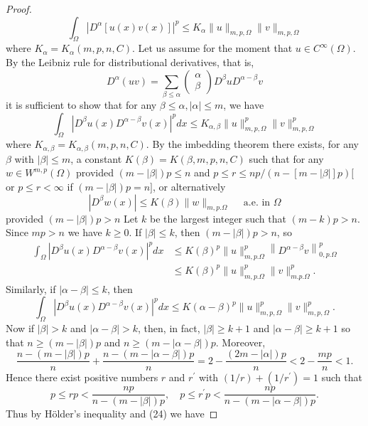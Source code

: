 \begin{proof}
  \[
  \int_{\Omega}\left|D^\alpha[u(x) v(x)]\right|^p \leq K_\alpha\|u\|_{m, p, \Omega}\|v\|_{m, p, \Omega}
  \]
  where $K_\alpha=K_\alpha(m, p, n, C)$. Let us assume for the moment that $u \in C^{\infty}(\Omega)$. By the Leibniz rule for distributional derivatives, that is,
  \[
  D^\alpha(u v)=\sum_{\beta \leq \alpha}\left(\begin{array}{l}
  \alpha \\
  \beta
  \end{array}\right) D^\beta u D^{\alpha-\beta} v
  \]
  it is sufficient to show that for any $\beta \leq \alpha,|\alpha| \leq m$, we have
  \[
  \int_{\Omega}\left|D^\beta u(x) D^{\alpha-\beta} v(x)\right|^p d x \leq K_{\alpha, \beta}\|u\|_{m, p, \Omega}^p\|v\|_{m, p, \Omega}^p
  \]
  where $K_{\alpha, \beta}=K_{\alpha, \beta}(m, p, n, C)$. By the imbedding theorem there exists, for any $\beta$ with $|\beta| \leq m$, a constant $K(\beta)=K(\beta, m, p, n, C)$ such that for any $w \in W^{m, p}(\Omega)$
  provided $(m-|\beta|) p \leq n$ and $p \leq r \leq n p /(n-[m-|\beta|] p)[$ or $p \leq r<\infty$ if $(m-|\beta|) p=n]$, or alternatively
  \[
  \left|D^\beta w(x)\right| \leq K(\beta)\|w\|_{m, p . \Omega} \quad \text { a.e. in } \Omega
  \]
  provided $(m-|\beta|) p>n$
  Let $k$ be the largest integer such that $(m-k) p>n$. Since $m p>n$ we have $k \geq 0$. If $|\beta| \leq k$, then $(m-|\beta|) p>n$, so
  \[
  \begin{aligned}
  \int_{\Omega}\left|D^\beta u(x) D^{\alpha-\beta} v(x)\right|^p d x & \leq K(\beta)^p\|u\|_{m, p . \Omega}^p\left\|D^{\alpha-\beta} v\right\|_{0, p . \Omega}^p \\
  & \leq K(\beta)^p\|u\|_{m, p . \Omega}^p\|v\|_{m . p . \Omega}^p .
  \end{aligned}
  \]
  Similarly, if $|\alpha-\beta| \leq k$, then
  \[
  \int_{\Omega}\left|D^\beta u(x) D^{\alpha-\beta} v(x)\right|^p d x \leq K(\alpha-\beta)^p\|u\|_{m, p, \Omega}^p\|v\|_{m, p, \Omega}^p .
  \]
  Now if $|\beta|>k$ and $|\alpha-\beta|>k$, then, in fact, $|\beta| \geq k+1$ and $|\alpha-\beta| \geq k+1$ so that $n \geq(m-|\beta|) p$ and $n \geq(m-|\alpha-\beta|) p$. Moreover,
  \[
  \frac{n-(m-|\beta|) p}{n}+\frac{n-(m-|\alpha-\beta|) p}{n}=2-\frac{(2 m-|\alpha|) p}{n}<2-\frac{m p}{n}<1 .
  \]
  Hence there exist positive numbers $r$ and $r^{\prime}$ with $(1 / r)+\left(1 / r^{\prime}\right)=1$ such that
  \[
  p \leq r p<\frac{n p}{n-(m-|\beta|) p}, \quad p \leq r^{\prime} p<\frac{n p}{n-(m-|\alpha-\beta|) p} .
  \]
  Thus by Hölder's inequality and (24) we have

\end{proof}
